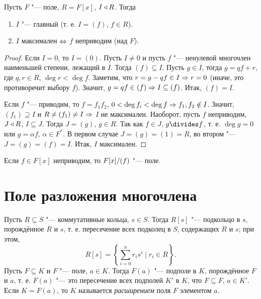 \documentclass[main]{subfiles}
\begin{document}
\begin{theorem}
  Пусть \( F \) "--- поле, \( R = F[x] \),
  \( I \triangleleft R \). Тогда
  \begin{enumerate}
    \item \( I \) "--- главный (т. е. \( I = (f) \), \( f \in R\)).
    \item \( I \) максимален \( \Leftrightarrow \) \( f \) неприводим
      (над \( F \)).
  \end{enumerate}
\end{theorem}
\begin{proof}
  Если \( I = 0 \), то \( I = (0) \).
  Пусть \( I \ne 0 \) и пусть \( f \) "--- ненулевой многочлен
  наименьшей степени, лежащий в \( I \).
  Тогда \( (f) \subseteq I \).
  Пусть \( g \in I \), тогда \( g = qf + r \), где
  \( q, r \in R \), \( \deg r < \deg f \). Заметим,
  что \( r = g - qf \in I \Rightarrow r = 0 \) (иначе,
  это противоречит выбору \( f \)).
  Значит, \( g = qf \in (f) \Rightarrow I \subseteq (f) \).
  Итак, \( (f) = I \).

  Если \( f \) "--- приводим, то \( f = f_1 f_2 \),
  \( 0 < \deg f_i < \deg f \Rightarrow f_1, f_2 \notin I \).
  Значит, \( (f_1) \supseteq I \) и \( R \ne (f_1) \ne I \Rightarrow \)
  \( I \) не максимален.
  Наоборот, пусть \( f \) неприводим, \( J \triangleleft R \),
  \( I \subseteq J \). Тогда \( J = (g) \),
  \( g \in R \). Так как \( f \in J \),
  \( g \divides f \), т. е. \( \deg g = 0 \)
  или \( g = \alpha f \), \( \alpha \in F^* \).
  В первом случае \( J = (g) = (1) = R \),
  во втором "--- \( J = (g) = (f) = I \).
  Итак, \( I \) максимален.
\end{proof}
\begin{corollary}
  Если \( f \in F[x] \) неприводим,
  то \( \Factor{F[x]}[(f)] \) "--- поле.
\end{corollary}

\section{Поле разложения многочлена}
\begin{definition}
  Пусть \( R \subseteq S \) "--- коммутативные кольца,
  \( s \in S \). Тогда \( R[s] \) "--- подкольцо в \( s \),
  порождённое \( R \) и \( s \), т. е.
  пересечение всех подколец в \( S \), содержащих
  \( R \) и \( s \); при этом,
  \[
    R[s] = 
    \left\{
      \sum_{i = 0}^n r_i s^i \mid r_i \in R
    \right\}.
  \]
  Пусть \( F \subseteq K \) и \( F \) "--- поле, \( a \in K \).
  Тогда \( F(a) \) "--- подполе в \( K \), порождённое
  \( F \) и \( a \), т. е.
  \( F(a) \) "--- это пересечение всех подполей \( K' \) в \( K \),
  что \( F \subseteq F \), \( a \in K' \).
  Если \( K = F(a) \), то \( K \) называется
  \emph{расширением} поля \( F \) элементом \( a \).
\end{definition}
\end{document}
